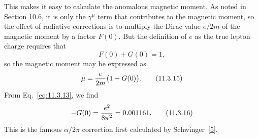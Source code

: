 This makes it easy to calculate the anomalous magnetic moment. As noted in
Section 10.6, it is only the $\gamma^\mu$ term that contributes to the magnetic
moment, so the effect of radiative corrections is to multiply the Dirac value
$e/2m$ of the magnetic moment by a factor $F(0)$. But the definition of $e$
as the true lepton charge requires that
\begin{equation}
F(0)+G(0)=1,
\tag{11.3.14}\label{eq:11.3.14}
\end{equation}
so the magnetic moment may be expressed as
\begin{equation}
\mu={e\over2m}\bigl(1-G(0)\bigr).
\tag{11.3.15}\label{eq:11.3.15}
\end{equation}
From Eq.~\eqref{eq:11.3.13}, we find
\begin{equation}
-G(0)={e^2\over8\pi^2}=0.001161.
\tag{11.3.16}\label{eq:11.3.16}
\end{equation}
This is the famous $\alpha/2\pi$ correction first calculated by Schwinger~\hyperref[ref:11.5]{[5]}.

